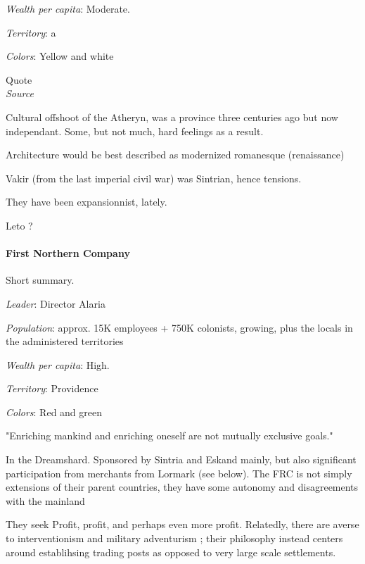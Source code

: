 \textit{Wealth per capita}: Moderate.

\textit{Territory}: a
    
\textit{Colors}: Yellow and white


\begin{rpg-quotebox}
    Quote \\ \textendash \textit{Source}
    \end{rpg-quotebox}


Cultural offshoot of the Atheryn, was a province three centuries ago but now independant. Some, but not much, hard feelings as a result.

Architecture would be best described as modernized romanesque (renaissance)

Vakir (from the last imperial civil war) was Sintrian, hence tensions.

They have been expansionnist, lately.


Leto ?



\paragraph{First Northern Company}


Short summary.

\textit{Leader}: Director Alaria

\textit{Population}: approx. 15K employees + 750K colonists, growing, plus the locals in the administered territories

\textit{Wealth per capita}: High.

\textit{Territory}: Providence
    
\textit{Colors}: Red and green


\begin{rpg-quotebox}
"Enriching mankind and enriching oneself are not mutually exclusive goals."
\end{rpg-quotebox}


In the Dreamshard. Sponsored by Sintria and Eskand mainly, but also significant participation from merchants from Lormark (see below).  
The FRC is not simply extensions of their parent countries, they have some autonomy and disagreements with the mainland


They seek Profit, profit, and perhaps even more profit. Relatedly, there are averse to interventionism and military adventurism ; their philosophy instead centers around establihsing trading posts as opposed to very large scale settlements.

